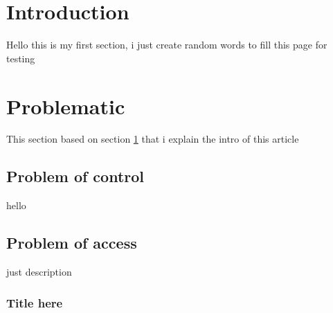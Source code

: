 \documentclass{article}
\begin{document}
	\section{Introduction}
	\label{intro section}
	Hello this is my first section, i just create random words to fill this page for testing
	
	\section{Problematic}
	This section based on section \ref{intro section} that i explain the intro of this article
	
	\subsection{Problem of control}
	hello
	\subsection{Problem of access}
 	just description
	\subsubsection{Title here}
\end{document}

